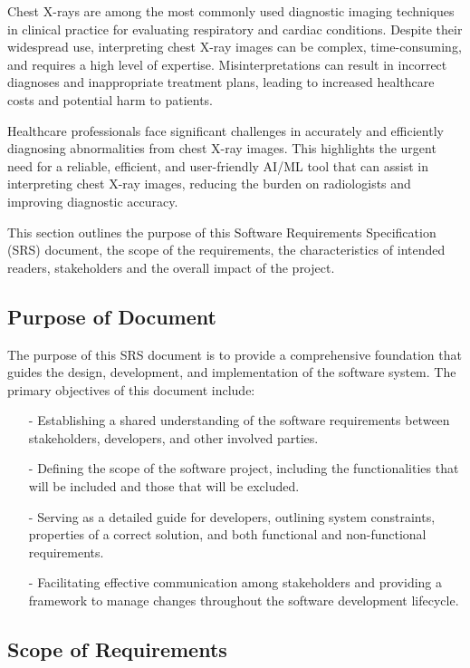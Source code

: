 \documentclass[12pt]{article}
\begin{document}
Chest X-rays are among the most commonly used diagnostic imaging techniques in clinical practice for evaluating respiratory and cardiac conditions. Despite their widespread use, interpreting chest X-ray images can be complex, time-consuming, and requires a high level of expertise. Misinterpretations can result in incorrect diagnoses and inappropriate treatment plans, leading to increased healthcare costs and potential harm to patients.

\noindent Healthcare professionals face significant challenges in accurately and efficiently diagnosing abnormalities from chest X-ray images. This highlights the urgent need for a reliable, efficient, and user-friendly AI/ML tool that can assist in interpreting chest X-ray images, reducing the burden on radiologists and improving diagnostic accuracy.

\noindent This section outlines the purpose of this Software Requirements Specification (SRS) document, the scope of the requirements, the characteristics of intended readers, stakeholders and the overall impact of the project.

\subsection{Purpose of Document}

The purpose of this SRS document is to provide a comprehensive foundation that guides the design, development, and implementation of the software system. The primary objectives of this document include:

\begin{itemize}
    \item[-] Establishing a shared understanding of the software requirements between stakeholders, developers, and other involved parties.
    \item[-] Defining the scope of the software project, including the functionalities that will be included and those that will be excluded.
    \item[-] Serving as a detailed guide for developers, outlining system constraints, properties of a correct solution, and both functional and non-functional requirements.
    \item[-] Facilitating effective communication among stakeholders and providing a framework to manage changes throughout the software development lifecycle.
\end{itemize}

\subsection{Scope of Requirements}
\end{document}
